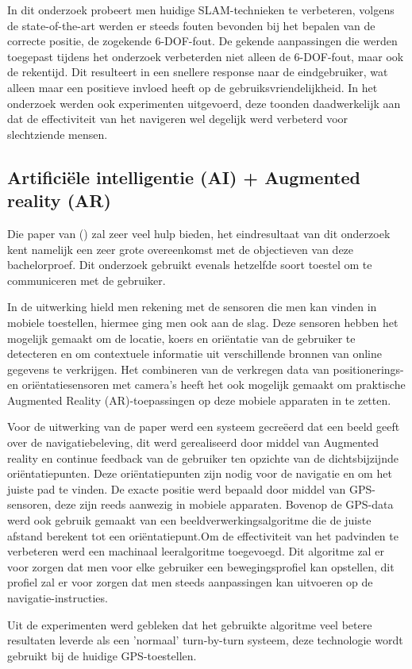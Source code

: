 In dit onderzoek probeert men huidige SLAM-technieken te verbeteren, volgens de state-of-the-art werden er steeds fouten bevonden bij het bepalen van de correcte positie, de zogekende 6-DOF-fout. De gekende aanpassingen die werden toegepast tijdens het onderzoek verbeterden niet alleen de 6-DOF-fout, maar ook de rekentijd. Dit resulteert in een snellere response naar de eindgebruiker, wat alleen maar een positieve invloed heeft op de gebruiksvriendelijkheid. In het onderzoek werden ook experimenten uitgevoerd, deze toonden daadwerkelijk aan dat de effectiviteit van het navigeren wel degelijk werd verbeterd voor slechtziende mensen.

\subsection{Artificiële intelligentie (AI) + Augmented reality (AR)}
Die paper van \textcite{Pouria2016} () zal zeer veel hulp bieden, het eindresultaat van dit onderzoek kent namelijk een zeer grote overeenkomst met de objectieven van deze bachelorproef. Dit onderzoek gebruikt evenals hetzelfde soort toestel om te communiceren met de gebruiker.

In de uitwerking hield men rekening met de sensoren die men kan vinden in mobiele toestellen, hiermee ging men ook aan de slag. Deze sensoren hebben het mogelijk gemaakt om de locatie, koers en oriëntatie van de gebruiker te detecteren en om contextuele informatie uit verschillende bronnen van online gegevens te verkrijgen. Het combineren van de verkregen data van positionerings- en oriëntatiesensoren met camera's heeft het ook mogelijk gemaakt om praktische Augmented Reality (AR)-toepassingen op deze mobiele apparaten in te zetten. 

Voor de uitwerking van de paper werd een systeem gecreëerd dat een beeld geeft over de navigatiebeleving, dit werd gerealiseerd door middel van Augmented reality en continue feedback van de gebruiker ten opzichte van de dichtsbijzijnde oriëntatiepunten. Deze oriëntatiepunten zijn nodig voor de navigatie en om het juiste pad te vinden. De exacte positie werd bepaald door middel van GPS-sensoren, deze zijn reeds aanwezig in mobiele apparaten. Bovenop de GPS-data werd ook gebruik gemaakt van een beeldverwerkingsalgoritme die de juiste afstand berekent tot een oriëntatiepunt.Om de effectiviteit van het padvinden te verbeteren werd een machinaal leeralgoritme toegevoegd. Dit algoritme zal er voor zorgen dat men voor elke gebruiker een bewegingsprofiel kan opstellen, dit profiel zal er voor zorgen dat men steeds aanpassingen kan uitvoeren op de navigatie-instructies.

Uit de experimenten werd gebleken dat het gebruikte algoritme veel betere resultaten leverde als een 'normaal' turn-by-turn systeem, deze technologie wordt gebruikt bij de huidige GPS-toestellen.

